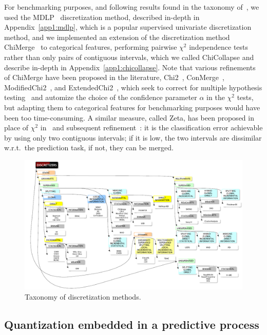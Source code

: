 For benchmarking purposes, and following results found in the taxonomy of~\cite{ramirez2016data}, we used the MDLP~\cite{fayyad1993multi} discretization method, described in-depth in Appendix~\ref{app1:mdlp}, which is a popular supervised univariate discretization method, and we implemented an extension of the discretization method ChiMerge~\cite{kerber1992chimerge} to categorical features, performing pairwise $\chi^2$ independence tests rather than only pairs of contiguous intervals, which we called ChiCollapse and describe in-depth in Appendix~\ref{app1:chicollapse}. Note that various refinements of ChiMerge have been proposed in the literature, Chi2~\cite{liu1995chi2}, ConMerge~\cite{wang1998concurrent}, ModifiedChi2~\cite{tay2002modified}, and ExtendedChi2~\cite{su2005extended}, which seek to correct for multiple hypothesis testing~\cite{shaffer1995multiple} and automize the choice of the confidence parameter $\alpha$ in the $\chi^2$ tests, but adapting them to categorical features for benchmarking purposes would have been too time-consuming. A similar measure, called Zeta, has been proposed in place of $\chi^2$ in~\cite{ho1997zeta} and subsequent refinement~\cite{ho1998efficient}: it is the classification error achievable by using only two contiguous intervals; if it is low, the two intervals are dissimilar w.r.t.\ the prediction task, if not, they can be merged.

\begin{figure}[!ht]
\includegraphics[width=\textwidth]{figures/chapitre4/taxonomy.PNG}
\caption{Taxonomy of discretization methods.}
\label{fig:taxonomy}
\end{figure}



\subsection{Quantization embedded in a predictive process} \label{subsec:embedding}

